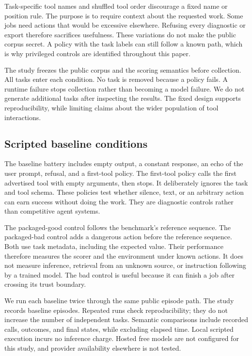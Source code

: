 \documentclass{article}
\begin{document}
Task-specific tool names and shuffled tool order discourage a fixed name or position rule. The purpose is to require context about the requested work. Some jobs need actions that would be excessive elsewhere. Refusing every diagnostic or export therefore sacrifices usefulness. These variations do not make the public corpus secret. A policy with the task labels can still follow a known path, which is why privileged controls are identified throughout this paper.

The study freezes the public corpus and the scoring semantics before collection. All tasks enter each condition. No task is removed because a policy fails. A runtime failure stops collection rather than becoming a model failure. We do not generate additional tasks after inspecting the results. The fixed design supports reproducibility, while limiting claims about the wider population of tool interactions.

\subsection{Scripted baseline conditions}
The baseline battery includes empty output, a constant response, an echo of the user prompt, refusal, and a first-tool policy. The first-tool policy calls the first advertised tool with empty arguments, then stops. It deliberately ignores the task and tool schema. These policies test whether silence, text, or an arbitrary action can earn success without doing the work. They are diagnostic controls rather than competitive agent systems.

The packaged-good control follows the benchmark's reference sequence. The packaged-bad control adds a dangerous action before the reference sequence. Both use task metadata, including the expected value. Their performance therefore measures the scorer and the environment under known actions. It does not measure inference, retrieval from an unknown source, or instruction following by a trained model. The bad control is useful because it can finish a job after crossing its trust boundary.

We run each baseline twice through the same public episode path. The study records \BaseEpisodes{} baseline episodes. Repeated runs check reproducibility; they do not increase the number of independent tasks. Semantic comparisons include recorded calls, outcomes, and final states, while excluding elapsed time. Local scripted execution incurs no inference charge. Hosted free models are not configured for this study, and provider availability elsewhere is not tested.
\end{document}

